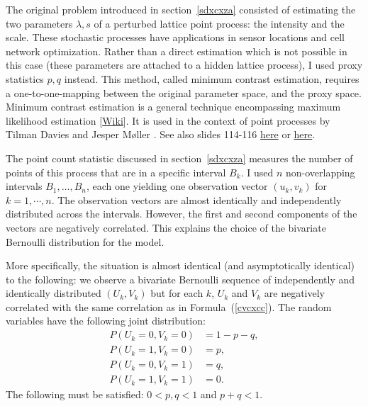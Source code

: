 \documentclass[oneside,10pt]{book}
\begin{document}
The original problem introduced in section~\ref{sdxcxza} consisted of estimating the two parameters 
 $\lambda, s$ of a perturbed lattice point process: the intensity and the scale. These stochastic processes have applications in sensor locations and cell network optimization. Rather than a direct estimation which is not possible in this case (these parameters are attached to a hidden lattice process), I used proxy statistics $p, q$ instead. This method, called 
\textcolor{index}{minimum contrast estimation}, requires a one-to-one-mapping between the original parameter space, and the proxy space. Minimum contrast estimation is a general technique encompassing 
 \textcolor{index}{maximum likelihood estimation} [\href{https://en.wikipedia.org/wiki/Maximum_likelihood_estimation}{Wiki}]. It is used in the context
 of point processes by Tilman Davies \cite{hghf} 
 and Jesper Møller \cite{momo55}. See also slides 114-116 \href{https://cimpatogo2018.sciencesconf.org/data/pages/Handout_Moller_CIMPA_Togo_2018.pdf}{here} or
\href{https://drive.google.com/file/d/1y5TZXvAL8fP9G5UkmV3npKgoVB0YWtXk/view?usp=sharing}{here}.



The point count statistic discussed in section~\ref{sdxcxza} measures the number of points of this process that are in a specific interval $B_k$. I used $n$ non-overlapping intervals $B_1,\dots, B_n$, each one yielding one observation vector $(u_k,v_k)$ for $k=1,\cdots,n$. The observation vectors are almost identically and independently distributed across the intervals. However, the first and second components of the vectors are negatively correlated. This explains the choice of the bivariate Bernoulli distribution for the model. 



More specifically, the situation is almost identical (and asymptotically identical) to the following: we observe a bivariate Bernoulli sequence of independently and identically distributed $(U_k, V_k)$ but for each $k$, $U_k$ and $V_k$ are negatively correlated with 
the same correlation as in Formula~(\ref{cvcxcc}). The random variables have the following joint distribution:
\begin{align}
 P(U_k=0,V_k=0) & =1-p-q,\nonumber \\
 P(U_k=1,V_k=0) & =p,\nonumber \\
 P(U_k=0,V_k=1) & =q, \nonumber \\
 P(U_k=1,V_k=1) & =0.\nonumber 
\end{align}
The following must be satisfied: $0<p,q<1$ and $p+q<1$. 
\end{document}

